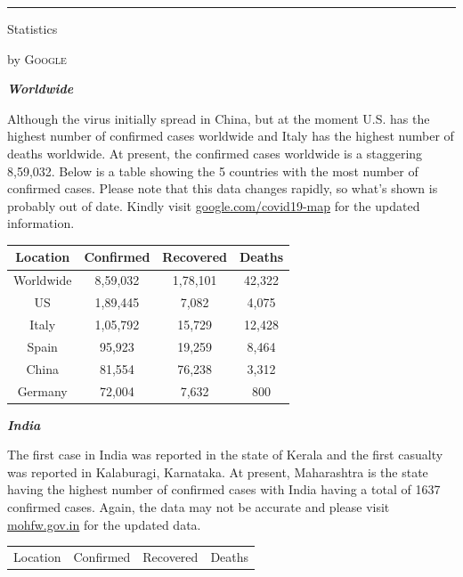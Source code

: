 \documentclass[10pt,a4paper]{article}
\newcommand{\SepRule}{\noindent							 %
						\begin{center}
							\rule{250pt}{1pt}
						\end{center}
						}
\newcommand{\NewsItem}[1]{%
		\usefont{T1}{augie}{m}{n} 	
		\large #1 \vspace{4pt}
		\par \normalsize \normalfont}
\newcommand{\NewsAuthor}[1]{%
			\hfill by \textsc{#1} \vspace{4pt}
			\par \normalfont}
\begin{document}
\begin{multicols}{2}
\vspace{0.5cm}
	\SepRule
\vspace{0.5cm}
\NewsItem{Statistics}
\NewsAuthor{Google}
    \begin{flushleft}\textbf{\textit{Worldwide}}\end{flushleft}
    Although the virus initially spread in China, but at the moment U.S. has the highest number of confirmed cases worldwide and Italy has the highest number of deaths worldwide. At present, the confirmed cases worldwide is a staggering 8,59,032. Below is a table showing the 5 countries with the most number of confirmed cases. Please note that this data changes rapidly, so what’s shown is probably out of date. Kindly visit  \href{https://google.com/covid19-map/?hl=en}{google.com/covid19-map} for the updated information.
    \begin{center}
        \begin{tabular}{||c c c c||}
            \hline
             Location & Confirmed & Recovered & Deaths  \\
             \hline \hline
             Worldwide & 8,59,032 & 1,78,101 & 42,322 \\
             \hline \hline
             US & 1,89,445 & 7,082 & 4,075 \\
             \hline
             Italy & 1,05,792 & 15,729 & 12,428 \\
             \hline
             Spain & 95,923 & 19,259 & 8,464 \\
             \hline
             China & 81,554 & 76,238 & 3,312 \\
             \hline
             Germany & 72,004 & 7,632 & 800 \\
             \hline
        \end{tabular}
    \end{center}
    \begin{flushleft}\textbf{\textit{India}}\end{flushleft}
    The first case in India was reported in the state of Kerala and the first casualty was reported in Kalaburagi, Karnataka. At present, Maharashtra is the state having the highest number of confirmed cases with India having a total of 1637 confirmed cases. Again, the data may not be accurate and please visit \href{https://www.mohfw.gov.in}{mohfw.gov.in} for the updated data.
    \begin{center}
        \begin{tabular}{||c c c c||}
            \hline
             Location & Confirmed & Recovered & Deaths  \\

\end{tabular}
\end{center}
\end{multicols}
\end{document}
